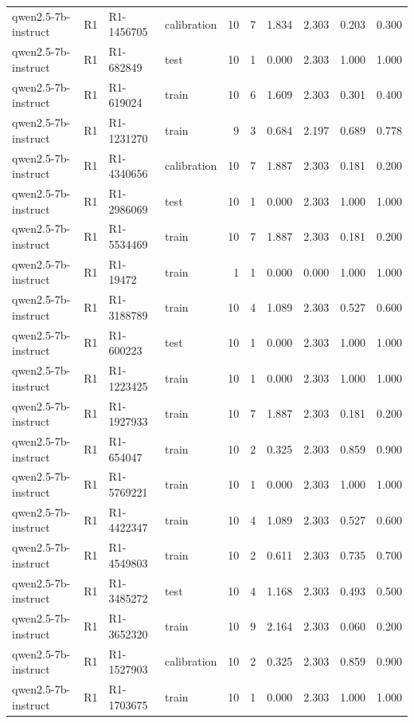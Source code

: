 \begin{table}
\begin{tabular}{llllrrrrrr}
qwen2.5-7b-instruct & R1 & R1-1456705 & calibration & 10 & 7 & 1.834 & 2.303 & 0.203 & 0.300 \\
qwen2.5-7b-instruct & R1 & R1-682849 & test & 10 & 1 & 0.000 & 2.303 & 1.000 & 1.000 \\
qwen2.5-7b-instruct & R1 & R1-619024 & train & 10 & 6 & 1.609 & 2.303 & 0.301 & 0.400 \\
qwen2.5-7b-instruct & R1 & R1-1231270 & train & 9 & 3 & 0.684 & 2.197 & 0.689 & 0.778 \\
qwen2.5-7b-instruct & R1 & R1-4340656 & calibration & 10 & 7 & 1.887 & 2.303 & 0.181 & 0.200 \\
qwen2.5-7b-instruct & R1 & R1-2986069 & test & 10 & 1 & 0.000 & 2.303 & 1.000 & 1.000 \\
qwen2.5-7b-instruct & R1 & R1-5534469 & train & 10 & 7 & 1.887 & 2.303 & 0.181 & 0.200 \\
qwen2.5-7b-instruct & R1 & R1-19472 & train & 1 & 1 & 0.000 & 0.000 & 1.000 & 1.000 \\
qwen2.5-7b-instruct & R1 & R1-3188789 & train & 10 & 4 & 1.089 & 2.303 & 0.527 & 0.600 \\
qwen2.5-7b-instruct & R1 & R1-600223 & test & 10 & 1 & 0.000 & 2.303 & 1.000 & 1.000 \\
qwen2.5-7b-instruct & R1 & R1-1223425 & train & 10 & 1 & 0.000 & 2.303 & 1.000 & 1.000 \\
qwen2.5-7b-instruct & R1 & R1-1927933 & train & 10 & 7 & 1.887 & 2.303 & 0.181 & 0.200 \\
qwen2.5-7b-instruct & R1 & R1-654047 & train & 10 & 2 & 0.325 & 2.303 & 0.859 & 0.900 \\
qwen2.5-7b-instruct & R1 & R1-5769221 & train & 10 & 1 & 0.000 & 2.303 & 1.000 & 1.000 \\
qwen2.5-7b-instruct & R1 & R1-4422347 & train & 10 & 4 & 1.089 & 2.303 & 0.527 & 0.600 \\
qwen2.5-7b-instruct & R1 & R1-4549803 & train & 10 & 2 & 0.611 & 2.303 & 0.735 & 0.700 \\
qwen2.5-7b-instruct & R1 & R1-3485272 & test & 10 & 4 & 1.168 & 2.303 & 0.493 & 0.500 \\
qwen2.5-7b-instruct & R1 & R1-3652320 & train & 10 & 9 & 2.164 & 2.303 & 0.060 & 0.200 \\
qwen2.5-7b-instruct & R1 & R1-1527903 & calibration & 10 & 2 & 0.325 & 2.303 & 0.859 & 0.900 \\
qwen2.5-7b-instruct & R1 & R1-1703675 & train & 10 & 1 & 0.000 & 2.303 & 1.000 & 1.000 \\

\end{tabular}
\end{table}
